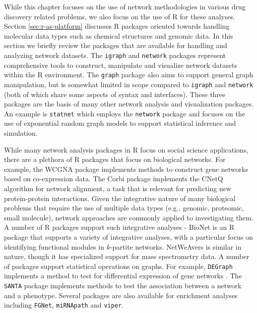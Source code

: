 \documentclass[]{book}
\begin{document}
While this chapter focuses on the use of network methodologies in
various drug discovery related problems, we also focus on the use of R
for these analyses. Section \ref{sec:r-as-platform} discusses R
packages oriented towards handling molecular data types such as
chemical structures and genomic data. In this section we briefly
review the packages that are available for handling and analyzing
network datasets. The \texttt{igraph} \cite{Csardi:2006lp} and
\texttt{network} \cite{Butts:2008tp} packages represent comprehensive
tools to construct, manipulate and visualize network datasets within
the R environment. The \texttt{graph} package \cite{Gentleman:1wt}
also aims to support general graph manipulation, but is somewhat
limited in scope compared to \texttt{igraph} and \texttt{network}
(both of which share some aspects of syntax and interfaces). These
three packages are the basis of many other network analysis and visualization
packages. An example is \texttt{statnet} \cite{Handcock:2008il} which
employs the \texttt{network} package and focuses on the use of
exponential random graph models \cite{Robins:2007cr} to support
statistical inference and simulation. 

While many network analysis packages in R focus on social science
applications, there are a plethora of R packages that focus on
biological networks. For example, the WCGNA package
\cite{Langfelder:2008cj} implements methods to construct gene networks
based on co-expression data. The Corbi package \cite{Huang:2013sy}
implements the CNetQ algorithm for network alignment, a task that is
relevant for predicting new protein-protein interactions. Given the
integrative nature of many biological problems that require the use of
multiple data types (e.g., genomic, proteomic, small molecule),
network approaches are commonly applied to investigating them. A
number of R packages support such integrative analyses - BioNet
\cite{Beisser:2010xp} is an R package that supports a variety of
integrative analyses, with a particular focus on identifying
functional modules in $k$-partite networks. NetWeAvers
\cite{McClellan:2013zf} is similar in nature, though it has
specialized support for mass spectrometry data. A number of packages
support statistical operations on graphs. For example,
\texttt{DEGraph} implements a method to test for differential
expression of gene networks \cite{Jacob:2012yg}. The \texttt{SANTA}
package \cite{Cornish:2014vs} implements methods to test the
association between a network and a phenotype. Several packages are
also available for enrichment analyses including \texttt{FGNet},
\texttt{miRNApath} and \texttt{viper}.
\end{document}
